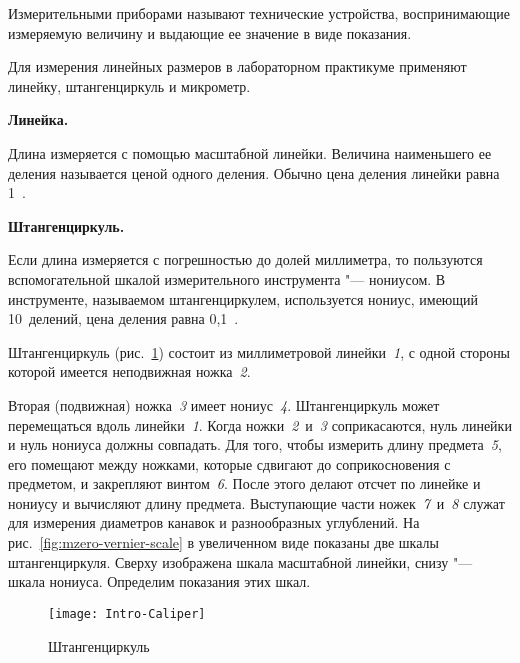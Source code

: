 \documentclass[a4paper, 12pt]{extarticle}
\begin{document}
Измерительными приборами называют технические устройства, воспринимающие измеряемую величину и выдающие ее значение в виде показания.

Для измерения линейных размеров в лабораторном практикуме применяют линейку, штангенциркуль и микрометр.


\textbf{Линейка.}

Длина измеряется с помощью масштабной линейки.
Величина  наименьшего ее деления называется ценой одного деления.
Обычно цена деления линейки равна 1~.

\textbf{Штангенциркуль.}

Если длина измеряется с погрешностью до долей миллиметра, то пользуются вспомогательной шкалой измерительного инструмента "--- нониусом. В инструменте, называемом штангенциркулем, используется нониус, имеющий 10~делений, цена деления равна 0,1~.

Штангенциркуль (рис.~\ref{fig:mzero-caliper}) состоит из миллиметровой линейки~\emph{1}, с одной стороны которой имеется неподвижная ножка~\emph{2}.

Вторая (подвижная) ножка~\emph{3} имеет нониус~\emph{4}. %
Штангенциркуль может перемещаться вдоль линейки~\emph{1}. Когда ножки~\emph{2}~и~\emph{3} соприкасаются, нуль линейки и нуль нониуса должны совпадать. Для того, чтобы измерить длину предмета~\emph{5}, его помещают между ножками, которые сдвигают до соприкосновения с предметом, и закрепляют винтом~\emph{6}. После этого делают отсчет по линейке и нониусу и вычисляют длину предмета.
Выступающие части ножек~\emph{7}~и~\emph{8} служат для измерения диаметров канавок и разнообразных углублений. На рис.~\ref{fig:mzero-vernier-scale} в увеличенном виде показаны две шкалы штангенциркуля. Сверху изображена шкала масштабной линейки,  снизу "--- шкала нониуса. Определим показания этих шкал.


\begin{figure}[ht]
 \begin{center}
  \texttt{[image: Intro-Caliper]}
  \caption{Штангенциркуль \label{fig:mzero-caliper}}
 \end{center}
\end{figure}
\end{document}
